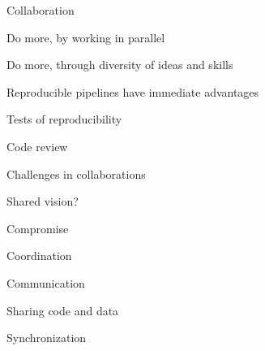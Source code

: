 \documentclass[aspectratio=169,12pt,t]{beamer}
\begin{document}
\begin{frame}[c]{Collaboration}

  \bbi
\item Do more, by working in parallel
\item Do more, through diversity of ideas and skills
\item Reproducible pipelines have immediate advantages
\item Tests of reproducibility
\item Code review
  \ei


\end{frame}



\begin{frame}[c]{Challenges in collaborations}

  \bbi
{
\item Shared vision?
\item Compromise
\item Coordination
\item Communication
\item Sharing code and data
\item Synchronization
}
  \ei


\end{frame}
\end{document}
